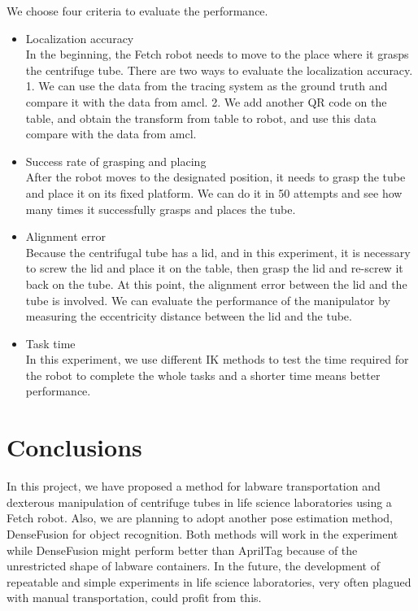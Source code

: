 \documentclass[12pt,draftclsnofoot,onecolumn]{IEEEtran}
\begin{document}
	We choose four criteria to evaluate the performance.
	\begin{itemize}
		\item  Localization accuracy\\
		In the beginning, the Fetch robot needs to move to the place where it grasps the centrifuge tube. There are two ways to evaluate the localization accuracy. 1. We can use the data from the tracing system as the ground truth and compare it with the data from amcl. 2. We add another QR code on the table, and obtain the transform from table to robot, and use this data compare with the data from amcl.
		\item Success rate of grasping and placing\\
				After the robot moves to the designated position, it needs to grasp the tube and place it on its fixed platform. We can do it in 50 attempts and see how many times it successfully grasps and places the tube.
		\item Alignment error\\
		Because the centrifugal tube has a lid, and in this experiment, it is necessary to screw the lid and place it on the table, then grasp the lid and re-screw it back on the tube. At this point, the alignment error between the lid and the tube is involved. We can evaluate the performance of the manipulator by measuring the eccentricity distance between the lid and the tube.
		\item Task time\\
		In this experiment, we use different IK methods to test the time required for the robot to complete the whole tasks and a shorter time means better performance.
		
	\end{itemize}
	
	\section{Conclusions}
	In this project, we have proposed a method for labware transportation and dexterous manipulation of centrifuge tubes in life science laboratories using a Fetch robot. Also, we are planning to adopt another pose estimation method, DenseFusion for object recognition. Both methods will work in the experiment while DenseFusion might perform better than AprilTag because of the unrestricted shape of labware containers. In the future, the development of repeatable and simple experiments in life science laboratories, very often plagued with manual transportation, could profit from this.
	
\end{document}

